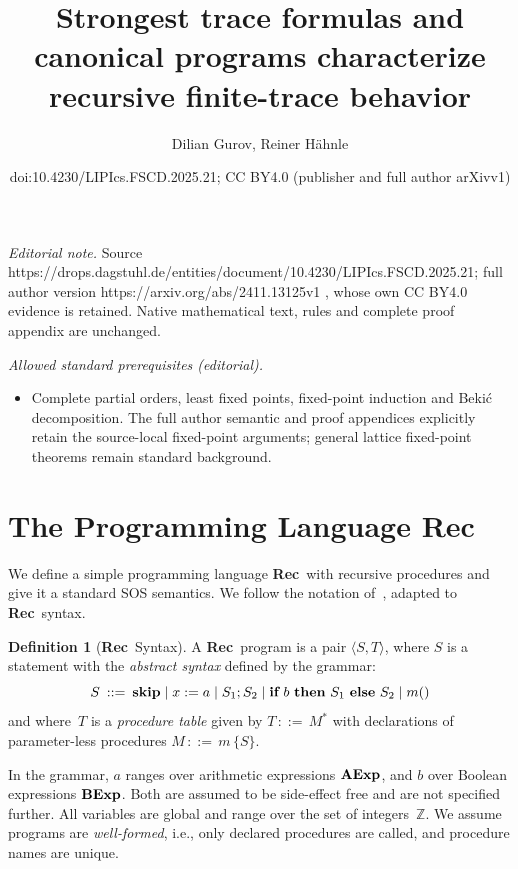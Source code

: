 \documentclass[10pt,a4paper]{amsart}
\title{Strongest trace formulas and canonical programs characterize recursive finite-trace behavior}
\author{Dilian Gurov, Reiner Hähnle}
\date{doi:10.4230/LIPIcs.FSCD.2025.21; CC BY4.0 (publisher and full author arXivv1)}
\theoremstyle{definition}
\newtheorem{definition}[theorem]{Definition}
\newcommand{\Rec}{\mbox{\bf Rec}}
\newcommand{\AExp}{\mbox{\bf AExp}}
\newcommand{\BExp}{\mbox{\bf BExp}}
\newcommand{\Skip}{\mbox{\bf skip}}
\newcommand{\If}{\mbox{\bf if}}
\newcommand{\Then}{\mbox{\bf then}}
\newcommand{\Else}{\mbox{\bf else}}
\begin{document}
\maketitle
\setcounter{section}{1}
\noindent\textit{Editorial note.} Source https://drops.dagstuhl.de/entities/document/10.4230/LIPIcs.FSCD.2025.21; full author version https://arxiv.org/abs/2411.13125v1 , whose own CC BY4.0 evidence is retained. Native mathematical text, rules and complete proof appendix are unchanged.\par\medskip
\noindent\textit{Allowed standard prerequisites (editorial).}\begin{itemize}
\item Complete partial orders, least fixed points, fixed-point induction and Bekić decomposition. The full author semantic and proof appendices explicitly retain the source-local fixed-point arguments; general lattice fixed-point theorems remain standard background.
\end{itemize}\medskip
\section{The Programming Language \Rec}
\label{sec:rec}

We define a simple programming language \Rec\ with recursive
procedures and give it a standard SOS semantics.  We follow the
notation of~\cite{nie-nie-07-book}, adapted to \Rec\ syntax.
%
\begin{definition}[\Rec\ Syntax]
  \label{def:rec-syntax}
  A \Rec\ program is a pair $\langle S, T\rangle$, where $S$ is a
  statement with the \emph{abstract syntax} defined by the grammar:
  $$
  S \>::=\> \Skip \mid 
  x := a \mid 
  S_1 ; S_2 \mid 
  \If\ b\ \Then\ S_1\ \Else\ S_2 \mid 
  m()
  $$
  and where~$T$ is a \emph{procedure table} given by $T\,::=\,M^\ast$ with
  declarations of parameter-less procedures $M\,::=\,m\,\{S\}$.

  In the grammar, $a$ ranges over arithmetic expressions $\AExp$, and
  $b$ over Boolean expressions $\BExp$. Both are assumed to be
  side-effect free and are not specified further. All variables are
  global and range over the set of integers~$\mathbb{Z}$. We assume
  programs are \emph{well-formed}, i.e., only declared procedures are
  called, and procedure names are unique.
\end{definition}
\end{document}

